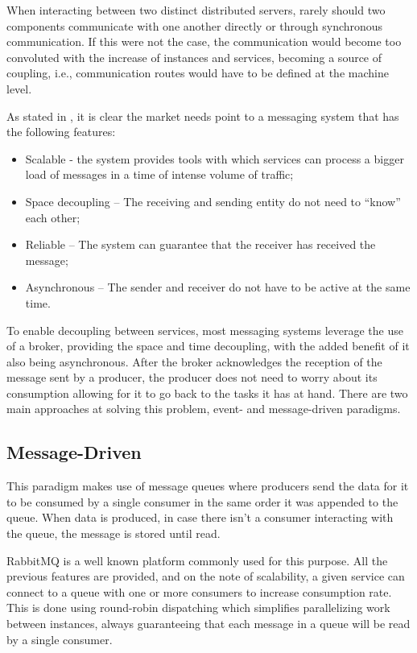 When interacting between two distinct distributed servers, rarely should two
components communicate with one another directly or through synchronous
communication. If this were not the case, the communication would become too
convoluted with the increase of instances and services, becoming a source of
coupling, i.e., communication routes would have to be defined at the machine
level. 

As stated in \cite{sharvari2019study}, it is clear the market needs point to a
messaging system that has the following features:
\begin{itemize}
    \item Scalable - the system provides tools with which services can process a
        bigger load of messages in a time of intense volume of traffic;
    \item Space decoupling – The receiving and sending entity do not need to
        “know” each other;
    \item Reliable – The system can guarantee that the receiver has received the
        message;
    \item Asynchronous  – The sender and receiver do not have to be active at
        the same time.
\end{itemize}

To enable decoupling between services, most messaging systems leverage the use
of a broker, providing the space and time decoupling, with the added
benefit of it also being asynchronous. After the broker acknowledges the
reception of the message sent by a producer, the producer does not need to
worry about its consumption allowing for it to go back to the tasks it has at
hand. There are two main approaches at solving this problem, event- and
message-driven paradigms.

\subsection{Message-Driven}

This paradigm makes use of message queues where producers send the data for it
to be consumed by a single consumer in the same order it was appended to the
queue. When data is produced, in case there isn’t a consumer interacting with
the queue, the message is stored until read. 

RabbitMQ is a well known platform commonly used for this purpose. All the
previous features are provided, and on the note of scalability, a given service
can connect to a queue with one or more consumers to increase consumption rate.
This is done using round-robin dispatching \cite{RabbitMQscale} which simplifies
parallelizing work between instances, always guaranteeing that each message in a
queue will be read by a single consumer.

